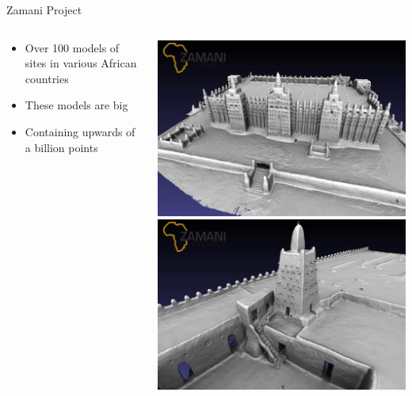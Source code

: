 \documentclass{beamer}
\begin{document}
\begin{frame}{Zamani Project}
\begin{columns}
\begin{column}{.65\linewidth}
\begin{itemize}
    \item Over 100 models of sites in various African countries
    \item These models are big
    \item Containing upwards of a billion points
\end{itemize}
\end{column}
\begin{column}{.35\linewidth}
\includegraphics[width=\linewidth]{images/zamani3.jpg} \\
\includegraphics[width=\linewidth]{images/zamani4.jpg}
\end{column}
\end{columns}

\end{frame}
\end{document}
